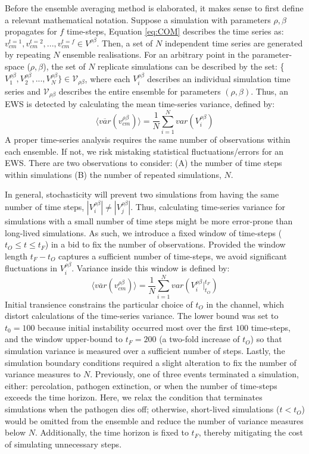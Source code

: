 Before the ensemble averaging method is elaborated, it makes sense to first define a relevant mathematical notation.
Suppose a simulation with parameters $\rho, \beta$ propagates for $f$ time-steps, Equation \ref{eq:COM} describes the time series as: $v_{cm}^{t=1}, v_{cm}^{t=2},..., v_{cm}^{t=f} \in V^{\rho\beta}$. 
Then, a set of $N$ independent time series are generated by repeating $N$ ensemble realisations. 
For an arbitrary point in the parameter-space ($\rho, \beta$),
the set of $N$ replicate simulations can be described by the set: \{$V_1^{\rho\beta}, V_2^{\rho \beta},..., V_N^{\rho\beta}\} \in \mathcal{V}_{\rho\beta}$, 
where each $V_i^{\rho\beta}$ describes an individual simulation time series and $\mathcal{V}_{\rho\beta}$ describes the entire ensemble for parameters $(\rho, \beta)$. 
Thus, an EWS is detected by calculating the mean time-series variance,
defined by:
\begin{equation}
\label{eq:ews_eq}
    \big\langle \overline{var}(v^{\rho\beta}_{cm}) \big\rangle = \frac{1}{N}\sum\limits_{i=1}^{N} var(V_i^{\rho\beta})
\end{equation}
A proper time-series analysis requires the same number of observations within each ensemble.
If not, we risk mistaking statistical fluctuations/errors for an EWS.
There are two observations to consider: 
(A) the number of time steps within simulations 
(B) the number of repeated simulations, $N$.

In general, stochasticity will prevent two simulations from having the same number of time steps, 
$|V_i^{\rho\beta}| \neq |V_j^{\rho\beta}|$.
Thus, calculating time-series variance for simulations with a small number of time steps might be more error-prone than long-lived simulations.
As such, we introduce a fixed window of time-steps ($t_O\leq t \leq t_F$) in a bid to fix the number of observations.
Provided the window length $t_F-t_O$ captures a sufficient number of time-steps, we avoid significant fluctuations in $V_i^{\rho\beta}$. 
Variance inside this window is defined by:
\begin{equation}
\label{eq:ews_eq1}
    \big\langle \overline{var}(v^{\rho\beta}_{cm}) \big\rangle = \frac{1}{N}\sum\limits_{i=1}^{N} var(V_i^{\rho\beta}\Big|^{t_F}_{t_O})
\end{equation}
Initial transience constrains the particular choice of $t_O$ in the channel, 
which distort calculations of the time-series variance. 
The lower bound was set to $t_0=100$ because initial instability occurred most over the first $100$ time-steps, and the window upper-bound to $t_F = 200$ (a two-fold increase of $t_O$) so that simulation variance is measured over a sufficient number of steps.
Lastly, the simulation boundary conditions required a slight alteration to fix the number of variance measures to $N$.
Previously, one of three events terminated a simulation, either: percolation, pathogen extinction, or when the number of time-steps exceeds the time horizon.
Here, we relax the condition that terminates simulations when the pathogen dies off;
otherwise, short-lived simulations ($t<t_O$) would be omitted from the ensemble and reduce the number of variance measures below $N$. 
Additionally, the time horizon is fixed to $t_F$, thereby mitigating the cost of simulating unnecessary steps.

